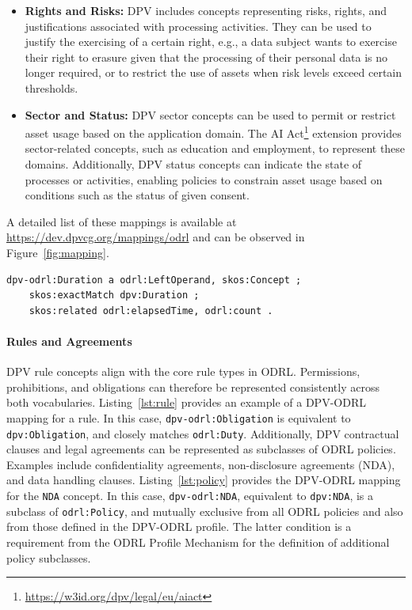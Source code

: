 \begin{itemize}
    \item \textbf{Rights and Risks:} DPV includes concepts representing risks, rights, and justifications associated with processing activities. They can be used to justify the exercising of a certain right, e.g., a data subject wants to exercise their right to erasure given that the processing of their personal data is no longer required, or to restrict the use of assets when risk levels exceed certain thresholds.
    \item \textbf{Sector and Status:} DPV sector concepts can be used to permit or restrict asset usage based on the application domain. The AI Act\footnote{\url{https://w3id.org/dpv/legal/eu/aiact}} extension provides sector-related concepts, such as education and employment, to represent these domains. Additionally, DPV status concepts can indicate the state of processes or activities, enabling policies to constrain asset usage based on conditions such as the status of given consent.
\end{itemize}
A detailed list of these mappings
is available at \url{https://dev.dpvcg.org/mappings/odrl}
and can be observed in Figure~\ref{fig:mapping}.

\begin{scriptsize}
\begin{lstlisting}[language=turtle, caption=DPV-ODRL mapping for the Duration concept.,  label=lst:duration]
dpv-odrl:Duration a odrl:LeftOperand, skos:Concept ;
    skos:exactMatch dpv:Duration ;
	skos:related odrl:elapsedTime, odrl:count .
\end{lstlisting}
\end{scriptsize}

\paragraph{Rules and Agreements}

DPV rule concepts align with the core rule types in ODRL.
Permissions, prohibitions, and obligations
can therefore be represented consistently across both vocabularies.
Listing~\ref{lst:rule} provides an example of a
DPV-ODRL mapping for a rule.
In this case,
\texttt{dpv-odrl:Obligation} is equivalent to \texttt{dpv:Obligation},
and closely matches \texttt{odrl:Duty}.
Additionally,
DPV contractual clauses and legal agreements
can be represented as subclasses of ODRL policies.
Examples include confidentiality agreements, 
non-disclosure agreements (NDA), and data handling clauses.
Listing~\ref{lst:policy} provides
the DPV-ODRL mapping for the \texttt{NDA} concept.
In this case,
\texttt{dpv-odrl:NDA},
equivalent to \texttt{dpv:NDA},
is a subclass of \texttt{odrl:Policy},
and mutually exclusive from all ODRL policies and
also from those defined in the DPV-ODRL profile.
The latter condition is a requirement from the 
ODRL Profile Mechanism
for the definition of additional policy subclasses.

